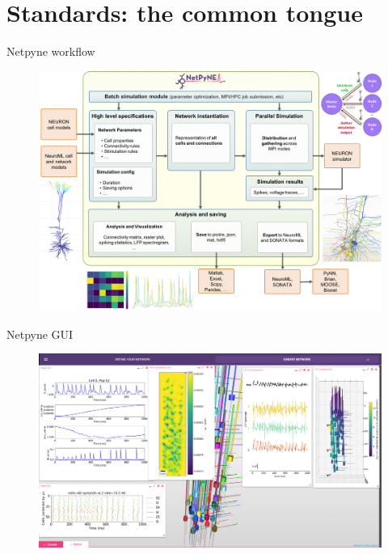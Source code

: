 \section{Standards: the common tongue}
{
  
  
  
  
}
\begin{frame}[c]{Netpyne workflow}
  \begin{figure}[h]
    \centering
    \includegraphics[width=\linewidth]{images/netpyne.png}
  \end{figure}
\end{frame}
\begin{frame}[c]{Netpyne GUI}
  \begin{figure}[h]
    \centering
    \includegraphics[width=\linewidth]{images/netpyne-gui.png}
  \end{figure}
\end{frame}
{
  
}
